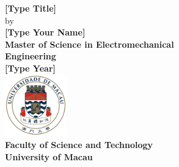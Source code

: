 \begin{titlepage}
\vspace*{\fill}
\begin{center}
{\large \textbf{[Type Title]}} \\[1.5\baselineskip]
{by} \\[1.5\baselineskip]
{\large \textbf{[Type Your Name]} } \\[6\baselineskip]
{\large \textbf{Master of Science in Electromechanical\\Engineering}} \\[6\baselineskip]
{\large \textbf{[Type Year]}}~\\[1\baselineskip]
\includegraphics[width=0.2\textwidth]{Figures/UMlogo}~\\%
{\large \textbf{Faculty of Science and Technology\\University of Macau}}
\end{center}
\vspace*{\fill}
\end{titlepage}